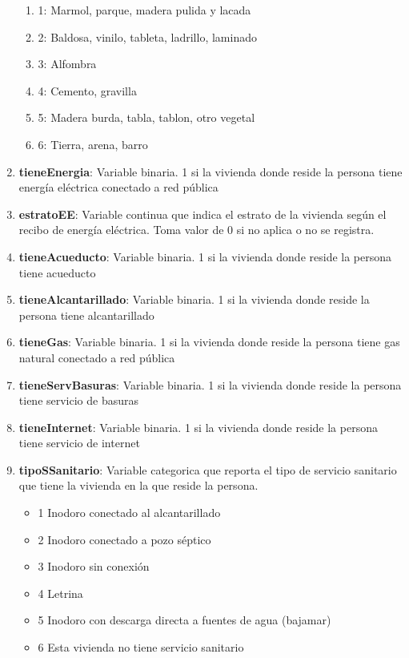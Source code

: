 \documentclass[12pt,a4paper]{article}
\begin{document}
\begin{enumerate}
\begin{enumerate}
			\item 1: Marmol, parque, madera pulida y lacada
			\item 2: Baldosa, vinilo, tableta, ladrillo, laminado
			\item 3: Alfombra
			\item 4: Cemento, gravilla
			\item 5: Madera burda, tabla, tablon, otro vegetal
			\item 6: Tierra, arena, barro
		\end{enumerate}
	\item \textbf{tieneEnergia}: Variable binaria. 1 si la vivienda donde reside la persona tiene energía eléctrica conectado a red pública
	\item \textbf{estratoEE}: Variable continua que indica el estrato de la vivienda según el recibo de energía eléctrica. Toma valor de 0 si no aplica o no se registra.
	\item \textbf{tieneAcueducto}: Variable binaria. 1 si la vivienda donde reside la persona tiene acueducto
	\item \textbf{tieneAlcantarillado}: Variable binaria. 1 si la vivienda donde reside la persona tiene alcantarillado
	\item \textbf{tieneGas}: Variable binaria. 1 si la vivienda donde reside la persona tiene gas natural conectado a red pública
	\item \textbf{tieneServBasuras}: Variable binaria. 1 si la vivienda donde reside la persona tiene servicio de basuras
	\item \textbf{tieneInternet}: Variable binaria. 1 si la vivienda donde reside la persona tiene servicio de internet
	\item \textbf{tipoSSanitario}: Variable categorica que reporta el tipo de servicio sanitario que tiene la vivienda en la que reside la persona.
		\begin{itemize}
			\item 1 Inodoro conectado al alcantarillado
			\item 2 Inodoro conectado a pozo séptico
			\item 3 Inodoro sin conexión
			\item 4 Letrina
			\item 5 Inodoro con descarga directa a fuentes de agua (bajamar)
			\item 6 Esta vivienda no tiene servicio sanitario
		\end{itemize}
	
\end{enumerate}
\end{document}
